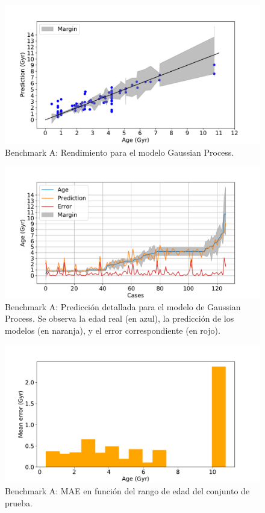 \begin{figure}[H]
\begin{center}
 \includegraphics[width=0.8\linewidth]{Figuras/Experimentos/B_A_gp_1.pdf}
\end{center}
\caption{Benchmark A: Rendimiento para el modelo Gaussian Process.}
 \label{fig:benchA_details_gp_1}
\end{figure}

\begin{figure}[H]
\begin{center}
 \includegraphics[width=0.8\linewidth]{Figuras/Experimentos/B_A_gp_2.pdf}
\end{center}
\caption{Benchmark A: Predicción detallada para el modelo de Gaussian Process. Se observa la edad real (en azul), la predicción de los modelos (en naranja), y el error correspondiente (en rojo).}
 \label{fig:benchA_details_gp_2}
\end{figure}

\begin{figure}[H]
\begin{center}
 \includegraphics[width=0.8\linewidth]{Figuras/Experimentos/B_A_gp_3.pdf}
\end{center}
\caption{Benchmark A: MAE en función del rango de edad del conjunto de prueba.}
 \label{fig:benchA_details_gp_3}
\end{figure}

